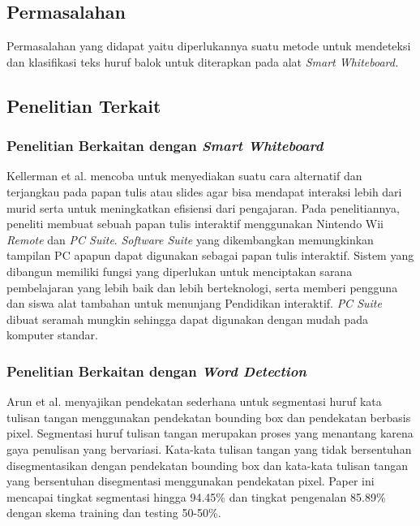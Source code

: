 \subsection{Permasalahan}

Permasalahan yang didapat yaitu diperlukannya suatu metode untuk mendeteksi dan klasifikasi teks huruf balok untuk diterapkan pada alat \textit{Smart Whiteboard.} 

\subsection{Penelitian Terkait}

\subsubsection{Penelitian Berkaitan dengan \textit{Smart Whiteboard}}
Kellerman et al. \citep*{kellerman2018smart} mencoba untuk menyediakan suatu cara alternatif dan terjangkau pada papan tulis atau slides agar bisa mendapat interaksi lebih dari murid serta untuk meningkatkan efisiensi dari pengajaran. Pada penelitiannya, peneliti membuat sebuah papan tulis interaktif menggunakan Nintendo Wii \textit{Remote} dan \textit{PC Suite}. \textit{Software Suite} yang dikembangkan memungkinkan tampilan PC apapun dapat digunakan sebagai papan tulis interaktif. Sistem yang dibangun memiliki fungsi yang diperlukan untuk menciptakan sarana pembelajaran yang lebih baik dan lebih berteknologi, serta memberi pengguna dan siswa alat tambahan untuk menunjang Pendidikan interaktif. \textit{PC Suite} dibuat seramah mungkin sehingga dapat digunakan dengan mudah pada komputer standar.\

\subsubsection{Penelitian Berkaitan dengan \textit{Word Detection}}
Arun et al. \citep*{arun2019handwritten} menyajikan pendekatan sederhana untuk segmentasi huruf kata tulisan tangan menggunakan pendekatan bounding box dan pendekatan berbasis pixel. Segmentasi huruf tulisan tangan merupakan proses yang menantang karena gaya penulisan yang bervariasi. Kata-kata tulisan tangan yang tidak bersentuhan disegmentasikan dengan pendekatan bounding box dan kata-kata tulisan tangan yang bersentuhan disegmentasi menggunakan pendekatan pixel. Paper ini mencapai tingkat segmentasi hingga 94.45\% dan tingkat pengenalan 85.89\% dengan skema training dan testing 50-50\%.

